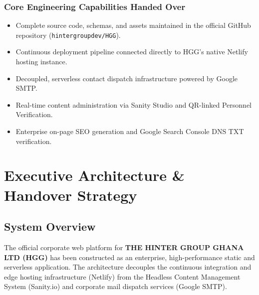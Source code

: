 \documentclass[11pt,a4paper,oneside]{book}
\begin{document}
\vspace{0.4cm}

\subsection*{Core Engineering Capabilities Handed Over}
\begin{itemize}[leftmargin=1.2cm]
  \item Complete source code, schemas, and assets maintained in the official GitHub repository (\texttt{hintergroupdev/HGG}).
  \item Continuous deployment pipeline connected directly to HGG's native Netlify hosting instance.
  \item Decoupled, serverless contact dispatch infrastructure powered by Google SMTP.
  \item Real-time content administration via Sanity Studio and QR-linked Personnel Verification.
  \item Enterprise on-page SEO generation and Google Search Console DNS TXT verification.
\end{itemize}

\clearpage

\tableofcontents
\clearpage

\mainmatter
\pagestyle{fancy}

\chapter{Executive Architecture \& Handover Strategy}

\section{System Overview}
The official corporate web platform for \textbf{THE HINTER GROUP GHANA LTD (HGG)} has been constructed as an enterprise, high-performance static and serverless application. The architecture decouples the continuous integration and edge hosting infrastructure (Netlify) from the Headless Content Management System (Sanity.io) and corporate mail dispatch services (Google SMTP).
\end{document}
